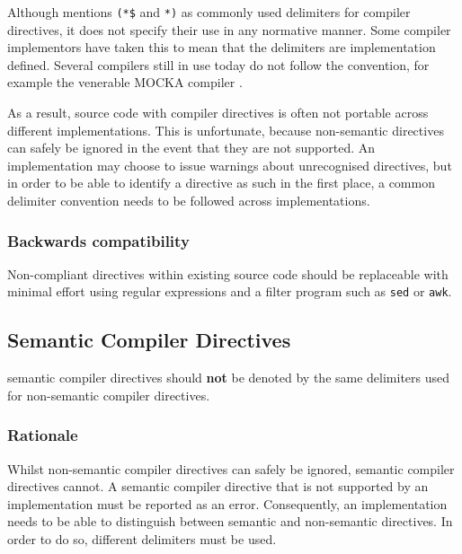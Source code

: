 \documentclass[10pt,a4paper]{article} %
\begin{document}
Although \cite{Wirth88} mentions \verb|(*$| and \verb|*)| as commonly used delimiters for \glspl{compiler directive}, it does not specify their use in any normative manner. Some compiler implementors have taken this to mean that the delimiters are implementation defined. Several compilers still in use today do not follow the convention, for example the venerable MOCKA compiler \cite{MOCKA}.

As a result, source code with \glspl{compiler directive} is often not portable across different implementations. This is unfortunate, because non-semantic directives can safely be ignored in the event that they are not supported. An implementation may choose to issue warnings about unrecognised directives, but in order to be able to identify a directive as such in the first place, a common delimiter convention needs to be followed across implementations.

\subsubsection{Backwards compatibility}

Non-compliant directives within existing source code should be replaceable with minimal effort using regular expressions and a filter program such as \verb|sed| or \verb|awk|. 


\subsection{Semantic Compiler Directives}

\Glspl{semantic compiler directive} should \textbf{not} be denoted by the same delimiters used for \glspl{non-semantic compiler directive}.

\subsubsection{Rationale}

Whilst \glspl{non-semantic compiler directive} can safely be ignored, \glspl{semantic compiler directive} cannot. A \gls{semantic compiler directive} that is not supported by an implementation must be reported as an error. Consequently, an implementation needs to be able to distinguish between semantic and non-semantic directives. In order to do so, different delimiters must be used.
\end{document}
